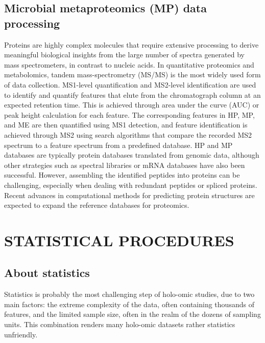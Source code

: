 \documentclass[
]{book}
\begin{document}
\hypertarget{microbial-metaproteomics-data-processing}{%
\chapter{Microbial metaproteomics (MP) data processing}\label{microbial-metaproteomics-data-processing}}

Proteins are highly complex molecules that require extensive processing to derive meaningful biological insights from the large number of spectra generated by mass spectrometers, in contrast to nucleic acids. In quantitative proteomics and metabolomics, tandem mass-spectrometry (MS/MS) is the most widely used form of data collection. MS1-level quantification and MS2-level identification are used to identify and quantify features that elute from the chromatograph column at an expected retention time. This is achieved through area under the curve (AUC) or peak height calculation for each feature. The corresponding features in HP, MP, and ME are then quantified using MS1 detection, and feature identification is achieved through MS2 using search algorithms that compare the recorded MS2 spectrum to a feature spectrum from a predefined database. HP and MP databases are typically protein databases translated from genomic data, although other strategies such as spectral libraries or mRNA databases have also been successful. However, assembling the identified peptides into proteins can be challenging, especially when dealing with redundant peptides or spliced proteins. Recent advances in computational methods for predicting protein structures are expected to expand the reference databases for proteomics.

\hypertarget{part-statistical-procedures}{%
\part{STATISTICAL PROCEDURES}\label{part-statistical-procedures}}

\hypertarget{about-statistics}{%
\chapter{About statistics}\label{about-statistics}}

Statistics is probably the most challenging step of holo-omic studies, due to two main factors: the extreme complexity of the data, often containing thousands of features, and the limited sample size, often in the realm of the dozens of sampling units. This combination renders many holo-omic datasets rather statistics unfriendly.
\end{document}

